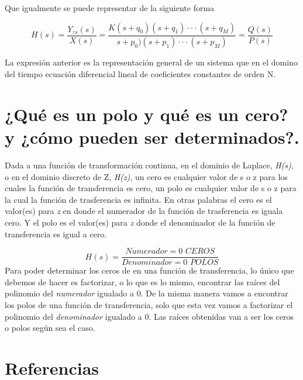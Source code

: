 \noindent Que igualmente se puede representar de la siguiente forma

\begin{equation}
	H(s)=\frac{Y_{zs}(s)}{X(s)} = \frac{K(s+q_0)(s+q_1)···(s+q_M)}{s+p_0)(s+p_1)···(s+p_M)} = \frac{Q(s)}{P(s)}
\end{equation}

\noindent La expresión anterior es la representación general de un sistema que en el domino del tiempo ecuación diferencial lineal de coeficientes constantes de orden N.
\section{¿Qué es un polo y qué es un cero? y ¿cómo pueden ser determinados?.}


Dada a una función de transformación continua, en el dominio de Laplace, \textit{H(s)}, o en el dominio discreto de Z, \textit{H(z)}, un cero es cualquier valor de s o z para los cuales la función de transferencia es cero, un polo es cualquier valor de s o z para la cual la función de trasferencia es infinita.\newline
En otras palabras el cero es el valor(es) para \textit{z} en donde el numerador de la función de trasferencia es iguala cero. Y el polo es el valor(es) para \textit{z} donde el denominador de la función de transferencia es igual a cero.

\[
H(s) = \frac{Numerador = 0 \textit{ CEROS} }{Denominador = 0 \textit{ POLOS}}
\]
\newline
Para poder determinar los ceros de en una función de transferencia, lo único que debemos de hacer es factorizar, o lo que es lo mismo, encontrar las raíces del polinomio del \textit{numerador} igualado a 0.\newline
De la misma manera vamos a encontrar los polos de una función de transferencia, solo que esta vez vamos a factorizar el polinomio del \textit{denominador} igualado a 0. Las raíces obtenidas van a ser los ceros o polos según sea el caso.\\


\section*{Referencias}

